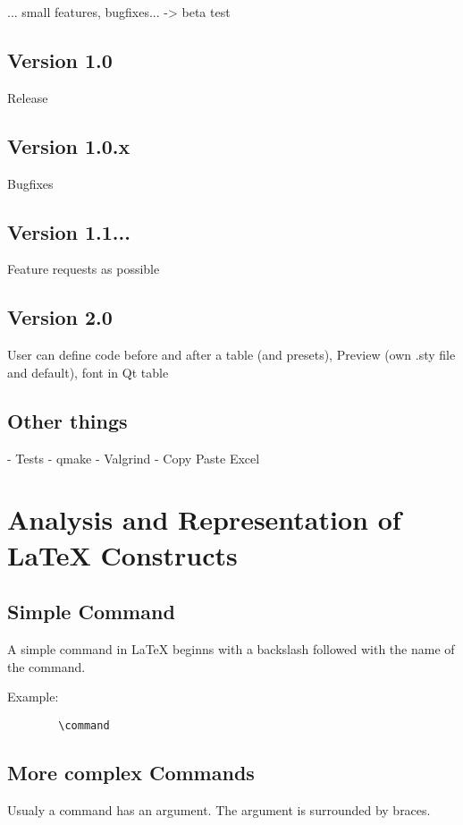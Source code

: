 ... small features, bugfixes...
-> beta test

\subsection{Version 1.0}
Release

\subsection{Version 1.0.x}
Bugfixes

\subsection{Version 1.1...}
Feature requests as possible

\subsection{Version 2.0}
User can define code before and after a table (and presets), Preview (own .sty file and default), font in Qt table

\subsection{Other things}
- Tests
- qmake
- Valgrind
- Copy Paste Excel



\section{Analysis and Representation of LaTeX Constructs}

\lstset{language=[LaTeX]TeX}

\subsection{Simple Command}
A simple command in LaTeX beginns with a backslash followed with the name of the command.

Example:
\begin{lstlisting}
		\command
\end{lstlisting}		

\subsection{More complex Commands}
Usualy a command has an argument. The argument is surrounded by braces.

